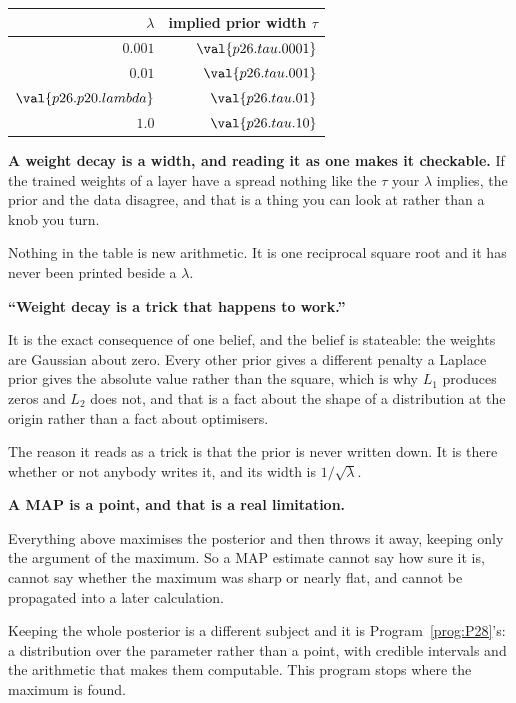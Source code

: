 \begin{fr}

\begin{center}
\begin{tabular}{rr}
\toprule
$\lambda$ & implied prior width $\tau$ \\
\midrule
$\num{0.001}$ & $\val{p26.tau.0001}$ \\
$\num{0.01}$ & $\val{p26.tau.001}$ \\
$\val{p26.p20.lambda}$ & $\val{p26.tau.01}$ \\
$\num{1.0}$ & $\val{p26.tau.10}$ \\
\bottomrule
\end{tabular}
\end{center}

\textbf{A weight decay is a width, and reading it as one makes it
checkable.} If the trained weights of a layer have a spread nothing like the
$\tau$ your $\lambda$ implies, the prior and the data disagree, and that is a
thing you can look at rather than a knob you turn.

Nothing in the table is new arithmetic. It is one reciprocal square root and
it has never been printed beside a $\lambda$.
\end{fr}

\begin{fr}
\begin{trapbox}
\textbf{\enquote{Weight decay is a trick that happens to work.}}

It is the exact consequence of one belief, and the belief is stateable: the
weights are Gaussian about zero. Every other prior gives a different
penalty \dash{} a Laplace prior gives the absolute value rather than the
square, which is why $L_1$ produces zeros and $L_2$ does not, and that is a
fact about the shape of a distribution at the origin rather than a fact about
optimisers.

The reason it reads as a trick is that the prior is never written down. It is
there whether or not anybody writes it, and its width is
$1/\sqrt{\lambda}$.
\end{trapbox}
\end{fr}

\begin{fr}
\begin{warning}
\textbf{A MAP is a point, and that is a real limitation.}

Everything above maximises the posterior and then throws it away, keeping
only the argument of the maximum. So a MAP estimate cannot say how sure it
is, cannot say whether the maximum was sharp or nearly flat, and cannot be
propagated into a later calculation.

Keeping the whole posterior is a different subject and it is
Program~\ref{prog:P28}'s: a distribution over the parameter rather than a
point, with credible intervals and the arithmetic that makes them
computable. This program stops where the maximum is found.
\end{warning}

\end{fr}

